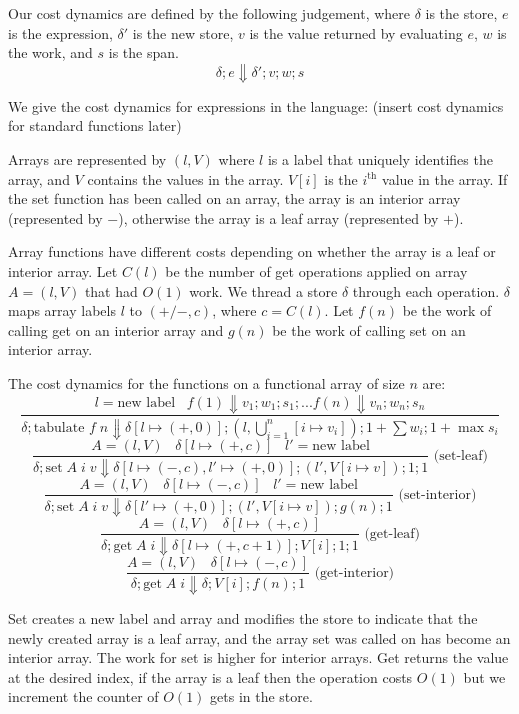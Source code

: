 \documentclass[preprint]{sigplanconf}
\begin{document}
Our cost dynamics are defined by the following judgement, where $\delta$ is the store, $e$ is the expression, $\delta'$ is the new store, $v$ is the value returned by evaluating $e$, $w$ is the work, and $s$ is the span.
$$\delta; e \boldsymbol\Downarrow \delta'; v; w; s$$

We give the cost dynamics for expressions in the language: (insert cost dynamics for standard functions later)

Arrays are represented by $(l, V)$ where $l$ is a label that uniquely identifies the array, and $V$ contains the values in the array. $V[i]$ is the $i^{\text{th}}$ value in the array. If the set function has been called on an array, the array is an interior array (represented by $-$), otherwise the array is a leaf array (represented by $+$). 

Array functions have different costs depending on whether the array is a leaf or interior array. Let $C(l)$ be the number of get operations applied on array $A = (l, V)$ that had $O(1)$ work. We thread a store $\delta$ through each operation. $\delta$ maps array labels $l$ to $(+/-, c)$, where $c = C(l)$. Let $f(n)$ be the work of calling get on an interior array and $g(n)$ be the work of calling set on an interior array.

The cost dynamics for the functions on a functional array of size $n$ are:
$$\frac{l = \text{new label} \;\;\; f(1) \Downarrow v_1; w_1; s_1; ... f(n) \Downarrow v_{n}; w_{n}; s_{n}}{\delta; \text{tabulate } f \; n \Downarrow \delta[l \mapsto (+, 0)]; (l, \bigcup_{i=1}^n [i \mapsto v_i]); 1+\sum w_i; 1+\max s_i}$$
$$\frac{A = (l,V) \;\;\; \delta[l \mapsto (+, c)] \;\;\; l' = \text{new label}}{\delta; \text{set} \; A \; i \; v \Downarrow \delta[l \mapsto (-, c), l' \mapsto (+, 0)]; (l', V[i \mapsto v]); 1; 1} \text{  (set-leaf)}$$
$$\frac{A = (l,V) \;\;\; \delta[l \mapsto (-, c)] \;\;\;  l' = \text{new label}}{\delta; \text{set} \; A \; i \; v \Downarrow \delta[l' \mapsto (+, 0)]; (l', V[i \mapsto v]); g(n); 1} \text{  (set-interior)}$$
$$\frac{A = (l,V) \;\;\; \delta[l \mapsto (+, c)]}{\delta; \text{get} \; A \; i \Downarrow \delta[l \mapsto (+, c+1)]; V[i]; 1; 1} \text{  (get-leaf)}$$
$$\frac{A = (l,V) \;\;\; \delta[l \mapsto (-, c)]}{\delta; \text{get} \; A \; i \Downarrow \delta; V[i]; f(n); 1} \text{  (get-interior)}$$

Set creates a new label and array and modifies the store to indicate that the newly created array is a leaf array, and the array set was called on has become an interior array. The work for set is higher for interior arrays. Get returns the value at the desired index, if the array is a leaf then the operation costs $O(1)$ but we increment the counter of $O(1)$ gets in the store.
\end{document}

